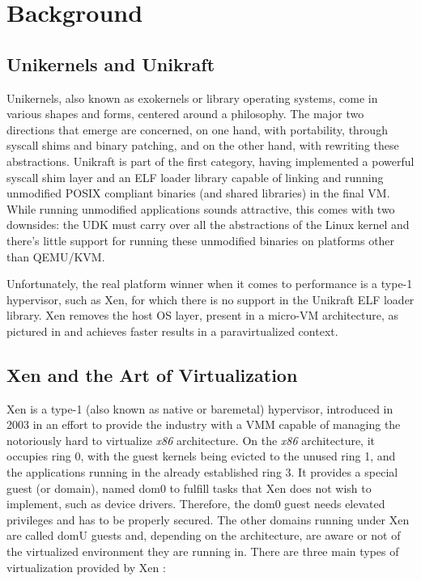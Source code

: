 \chapter{Background}
\label{chapter:background}

\section{Unikernels and Unikraft}
\label{sec:unikernels-unikraft}

Unikernels, also known as exokernels or library operating systems, come in various shapes and forms, centered around a philosophy.
The major two directions that emerge are concerned, on one hand, with portability, through syscall shims and binary patching, and on the other hand, with rewriting these abstractions.
Unikraft is part of the first category, having implemented a powerful syscall shim layer and an ELF loader library \cite{app-elfloader} capable of linking and running unmodified POSIX compliant binaries (and shared libraries) in the final VM.
While running unmodified applications sounds attractive, this comes with two downsides: the UDK must carry over all the abstractions of the Linux kernel and there's little support for running these unmodified binaries on platforms other than QEMU/KVM.

Unfortunately, the real platform winner when it comes to performance is a type-1 hypervisor, such as Xen, for which there is no support in the Unikraft ELF loader library.
Xen removes the host OS layer, present in a micro-VM architecture, as pictured in  and achieves faster results in a paravirtualized context.


\section{Xen and the Art of Virtualization \cite{art-of-xen}}
\label{sec:xen}

Xen is a type-1 (also known as native or baremetal) hypervisor, introduced in 2003 in an effort to provide the industry with a VMM capable of managing the notoriously hard to virtualize \textit{x86} architecture.
On the \textit{x86} architecture, it occupies ring 0, with the guest kernels being evicted to the unused ring 1, and the applications running in the already established ring 3.
It provides a special guest (or domain), named dom0 to fulfill tasks that Xen does not wish to implement, such as device drivers.
Therefore, the dom0 guest needs elevated privileges and has to be properly secured.
The other domains running under Xen are called domU guests and, depending on the architecture, are aware or not of the virtualized environment they are running in.
There are three main types of virtualization provided by Xen \cite{xen-virtualization-types}:

